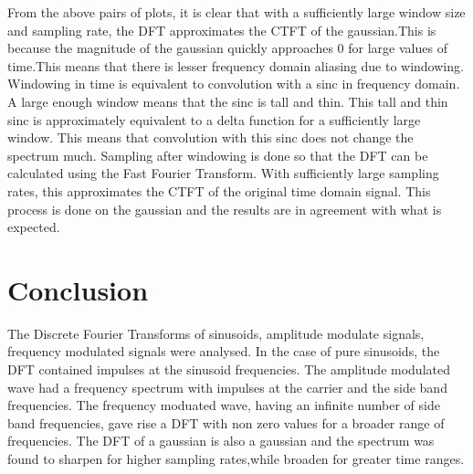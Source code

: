 \documentclass{article}
\begin{document}
From the above pairs of plots, it is clear that with a sufficiently large window size and sampling rate, the DFT approximates the CTFT of the gaussian.This is because the magnitude of the gaussian quickly approaches 0 for large values of time.This means that there is lesser frequency domain aliasing due to windowing. Windowing in time is equivalent to convolution with a sinc in frequency domain.  A large enough window means that the sinc is tall and thin. This tall and thin sinc is approximately equivalent to a delta function for a sufficiently large window.  This means that convolution with this sinc does not change the spectrum much. Sampling after windowing is done so that the DFT can be calculated using the Fast Fourier Transform.  With sufficiently large sampling rates, this approximates the CTFT of the original time domain signal. This process is done on the gaussian and the results are in agreement with what is expected.
\clearpage

\section{Conclusion}
 The Discrete Fourier Transforms of sinusoids, amplitude modulate signals,  frequency  modulated  signals  were  analysed.   In  the  case  of  pure sinusoids,  the  DFT  contained  impulses  at  the  sinusoid  frequencies.   The amplitude modulated wave had a frequency spectrum with impulses at the carrier and the side band frequencies. The frequency moduated wave, having an infinite number of side band frequencies, gave rise a DFT with non zero values for a broader range of frequencies.  The DFT of a gaussian is also a gaussian and the spectrum was found to sharpen for higher sampling rates,while broaden for greater time ranges.
\end{document}

